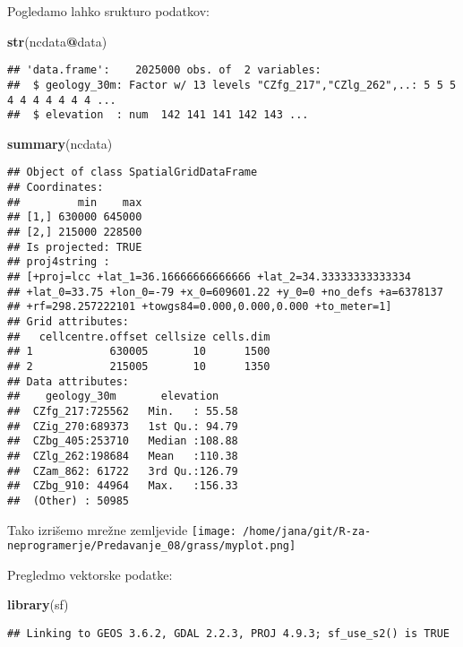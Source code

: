 \documentclass[]{article}
\newenvironment{Shaded}{\begin{snugshade}}{\end{snugshade}}
\newcommand{\KeywordTok}[1]{\textcolor[rgb]{0.13,0.29,0.53}{\textbf{#1}}}
\newcommand{\OperatorTok}[1]{\textcolor[rgb]{0.81,0.36,0.00}{\textbf{#1}}}
\newcommand{\NormalTok}[1]{#1}
\begin{document}
Pogledamo lahko srukturo podatkov:

\begin{Shaded}
\begin{Highlighting}[]
\KeywordTok{str}\NormalTok{(ncdata}\OperatorTok{@}\NormalTok{data)}
\end{Highlighting}
\end{Shaded}

\begin{verbatim}
## 'data.frame':    2025000 obs. of  2 variables:
##  $ geology_30m: Factor w/ 13 levels "CZfg_217","CZlg_262",..: 5 5 5 4 4 4 4 4 4 4 ...
##  $ elevation  : num  142 141 141 142 143 ...
\end{verbatim}

\begin{Shaded}
\begin{Highlighting}[]
\KeywordTok{summary}\NormalTok{(ncdata)}
\end{Highlighting}
\end{Shaded}

\begin{verbatim}
## Object of class SpatialGridDataFrame
## Coordinates:
##         min    max
## [1,] 630000 645000
## [2,] 215000 228500
## Is projected: TRUE 
## proj4string :
## [+proj=lcc +lat_1=36.16666666666666 +lat_2=34.33333333333334
## +lat_0=33.75 +lon_0=-79 +x_0=609601.22 +y_0=0 +no_defs +a=6378137
## +rf=298.257222101 +towgs84=0.000,0.000,0.000 +to_meter=1]
## Grid attributes:
##   cellcentre.offset cellsize cells.dim
## 1            630005       10      1500
## 2            215005       10      1350
## Data attributes:
##    geology_30m       elevation     
##  CZfg_217:725562   Min.   : 55.58  
##  CZig_270:689373   1st Qu.: 94.79  
##  CZbg_405:253710   Median :108.88  
##  CZlg_262:198684   Mean   :110.38  
##  CZam_862: 61722   3rd Qu.:126.79  
##  CZbg_910: 44964   Max.   :156.33  
##  (Other) : 50985
\end{verbatim}

Tako izrišemo mrežne zemljevide
\texttt{[image: /home/jana/git/R-za-neprogramerje/Predavanje\_08/grass/myplot.png]}

Pregledmo vektorske podatke:

\begin{Shaded}
\begin{Highlighting}[]
\KeywordTok{library}\NormalTok{(sf)}
\end{Highlighting}
\end{Shaded}

\begin{verbatim}
## Linking to GEOS 3.6.2, GDAL 2.2.3, PROJ 4.9.3; sf_use_s2() is TRUE
\end{verbatim}
\end{document}
